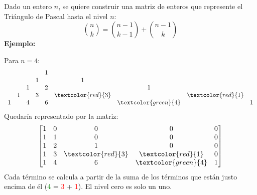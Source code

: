 Dado un entero \( n \), se quiere construir una matriz de enteros que represente el Triángulo de Pascal hasta el nivel \( n \):
$$
{n\choose k} = {n-1\choose k-1} + {n-1\choose k}
$$
\textbf{Ejemplo:} 

Para \( n = 4\):
\[
\begin{array}{ccccccccc}
    &  &   &   & 1 &   &   \\
    &  &   & 1 &   & 1 &   \\
    &  & 1 &   & 2 &   & 1 \\
    &  1 &  & 3 &   & \textcolor{red}{3} &  & \textcolor{red}{1} \\
  1 & & 4 & & 6 & & \textcolor{green}{4} & & 1 
\end{array}
\]
Quedaría representado por la matriz:
\[
\begin{bmatrix}
    1 & 0 & 0 & 0 & 0 \\
    1 & 1 & 0 & 0 & 0 \\
    1 & 2 & 1 & 0 & 0 \\
    1 & 3 & \textcolor{red}{3} & \textcolor{red}{1} & 0 \\
    1 & 4 & 6 & \textcolor{green}{4} & 1 \\
\end{bmatrix}
\]
Cada término se calcula a partir de la suma de los términos que están justo encima de él  
(\textcolor{green}{4} = \textcolor{red}{3} + \textcolor{red}{1}). El nivel cero es solo un uno. 